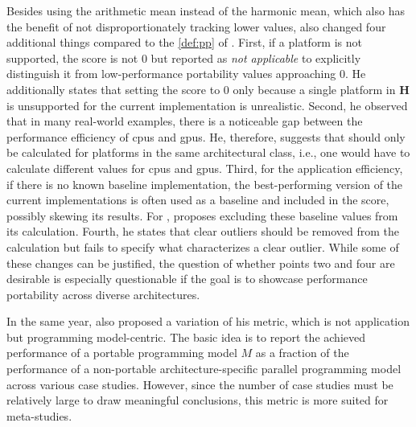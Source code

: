 Besides using the arithmetic mean instead of the harmonic mean, which also has the benefit of not disproportionately tracking lower values, \citeauthor{marowka_toward_2021} also changed four additional things compared to the \autoref{def:pp} of \pp. 
First, if a platform is not supported, the \mpp score is not $0$ but reported as \textit{not applicable} to explicitly distinguish it from low-performance portability values approaching $0$. 
He additionally states that setting the \pp score to $0$ only because a single platform in $\mathbf{H}$ is unsupported for the current implementation is unrealistic. 
Second, he observed that in many real-world examples, there is a noticeable gap between the performance efficiency of \glspl{cpu} and \glspl{gpu}. 
He, therefore, suggests that \mpp should only be calculated for platforms in the same architectural class, i.e., one would have to calculate different \mpp values for \glspl{cpu} and \glspl{gpu}. 
Third, for the application efficiency, if there is no known baseline implementation, the best-performing version of the current implementations is often used as a baseline and included in the \pp score, possibly skewing its results. 
For \mpp, \citeauthor{marowka_toward_2021} proposes excluding these baseline values from its calculation. 
Fourth, he states that clear outliers should be removed from the calculation but fails to specify what characterizes a clear outlier.
While some of these changes can be justified, the question of whether points two and four are desirable is especially questionable if the goal is to showcase performance portability across diverse architectures. 

In the same year, \citet{marowka_performance_2022} also proposed a variation of his \mpp metric, which is not application but programming model-centric. 
The basic idea is to report the achieved performance of a portable programming model $M$ as a fraction of the performance of a non-portable architecture-specific parallel programming model across various case studies. 
However, since the number of case studies must be relatively large to draw meaningful conclusions, this metric is more suited for meta-studies. 

